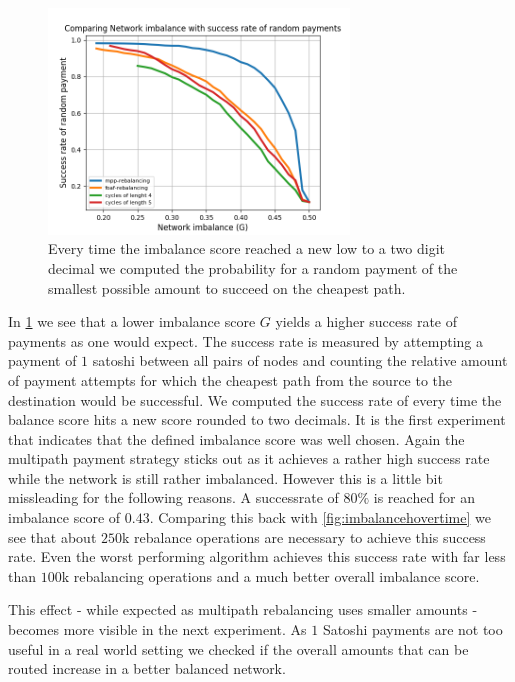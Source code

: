 \documentclass[a4paper]{paper}
\begin{document}
\begin{figure}
 \centering
 \includegraphics[width=8cm]{code/vs/fig/imba_vs_success_rates.png}
 \caption{Every time the imbalance score reached a new low to a two digit decimal we computed the probability for a random payment of the smallest possible amount to succeed on the cheapest path.}
 \label{fig:imba_vs_success}
\end{figure}

In \cref{fig:imba_vs_success} we see that a lower imbalance score $G$ yields a higher success rate of payments as one would expect.
The success rate is measured by attempting a payment of $1$ satoshi between all pairs of nodes and counting the relative amount of payment attempts for which the cheapest path from the source to the destination would be successful.
We computed the success rate of every time the balance score hits a new score rounded to two decimals.
It is the first experiment that indicates that the defined imbalance score was well chosen. 
Again the multipath payment strategy sticks out as it achieves a rather high success rate while the network is still rather imbalanced.
However this is a little bit missleading for the following reasons.
A successrate of $80\%$ is reached for an imbalance score of $0.43$.
Comparing this back with \cref{fig:imbalancehovertime} we see that about $250$k rebalance operations are necessary to achieve this success rate.
Even the worst performing algorithm achieves this success rate with far less than $100$k rebalancing operations and a much better overall imbalance score. 

This effect - while expected as multipath rebalancing uses smaller amounts - becomes more visible in the next experiment.
As $1$ Satoshi payments are not too useful in a real world setting we checked if the overall amounts that can be routed increase in a better balanced network.
\end{document}
